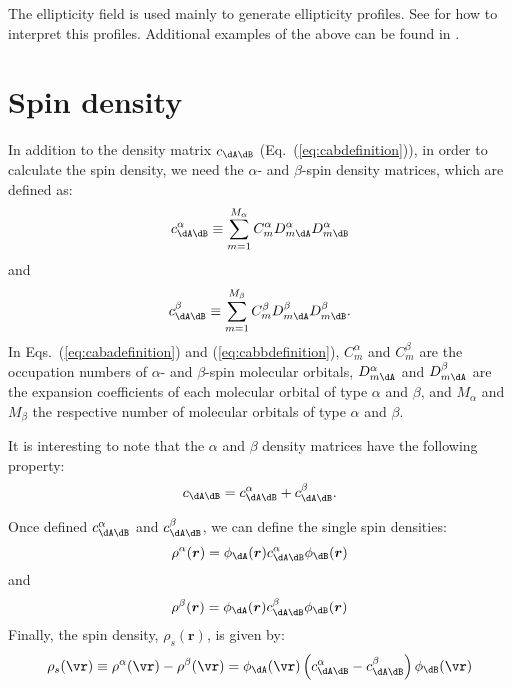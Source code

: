The ellipticity field is used mainly to generate ellipticity profiles. See 
\cite{bib:cheeseman1988} for how to interpret this profiles. Additional
examples of the above can be found in \cite{bib:tafipolsky2002}.

\section{Spin density}

In addition to the density matrix $c_{\dA\dB}$ (Eq.~(\ref{eq:cabdefinition})), in order to calculate the spin density,
we need the $\alpha$- and $\beta$-spin density matrices, which are defined as:
%
\begin{equation}\label{eq:cabadefinition}
	c_{\dA\dB}^{\alpha}\equiv
	\sum_{m=1}^{M_{\alpha}}C_m^{\alpha}D_{m\dA}^{\alpha}D_{m\dB}^{\alpha}
\end{equation}
%
and
%
\begin{equation}\label{eq:cabbdefinition}
	c_{\dA\dB}^{\beta}\equiv
	\sum_{m=1}^{M_{\beta}}C_m^{\beta}D_{m\dA}^{\beta}D_{m\dB}^{\beta}.
\end{equation}
%
In Eqs.~(\ref{eq:cabadefinition}) and (\ref{eq:cabbdefinition}), $C_m^{\alpha}$ and
$C_m^{\beta}$ are the occupation numbers of $\alpha$- and $\beta$-spin molecular orbitals,
$D_{m\dA}^{\alpha}$ and $D_{m\dA}^{\beta}$ are the expansion coefficients of each
molecular orbital of type $\alpha$ and $\beta$,
and $M_{\alpha}$ and $M_{\beta}$ the respective number of molecular orbitals of type
$\alpha$ and $\beta$.

It is interesting to note that the $\alpha$ and $\beta$ density matrices have the following
property:
%
\begin{equation}
	c_{\dA\dB}=c_{\dA\dB}^{\alpha}+c_{\dA\dB}^{\beta}.
\end{equation}
%

Once defined $c_{\dA\dB}^{\alpha}$ and $c_{\dA\dB}^{\beta}$, we can define the single spin
densities:
%
\begin{equation}
	\rho^{\alpha}(\boldsymbol r)=\phi_{\dA}(\boldsymbol r)c_{\dA\dB}^{\alpha}
	                             \phi_{\dB}(\boldsymbol r)
\end{equation}
%
and
%
\begin{equation}
	\rho^{\beta}(\boldsymbol r)=\phi_{\dA}(\boldsymbol r)c_{\dA\dB}^{\beta}
	                            \phi_{\dB}(\boldsymbol r)
\end{equation}
%
Finally, the spin density, $\rho_s(\boldsymbol r)$, is given by:
%
\begin{equation}
	\rho_s(\vr)\equiv\rho^{\alpha}(\vr)-\rho^{\beta}(\vr)=
	   \phi_{\dA}(\vr)\left(c_{\dA\dB}^{\alpha}-c_{\dA\dB}^{\beta}\right)\phi_{\dB}(\vr)
\end{equation}
%

